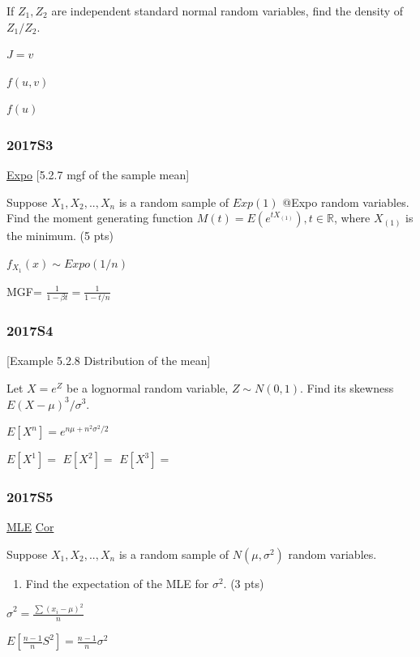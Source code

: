\documentclass[10pt,twocolumn,portrait]{article}
\providecommand{\tightlist}{%
  \setlength{\itemsep}{0pt}\setlength{\parskip}{0pt}}
\begin{document}
If \(Z_1,Z_2\) are independent standard normal random variables, find
the density of \(Z_1/Z_2\).

\(J=v\)

\(f(u,v)\)

\(f(u)\)

\hypertarget{s3-5}{%
\subsubsection{2017S3}\label{s3-5}}

\protect\hyperlink{Expo}{Expo} {[}5.2.7 mgf of the sample mean{]}

Suppose \(X_1,X_2,..,X_n\) is a random sample of \(Exp(1)\) @Expo random
variables. Find the moment generating function
\(M(t)=E(e^{tX_{(1)}}), t\in\mathbb R\), where \(X_{(1)}\) is the
minimum. (5 pts)

\(f_{X_{1}}(x)\sim Expo(1/n)\)

MGF= \(\frac1{1-\beta t}=\frac1{1-t/n}\)

\hypertarget{s4-5}{%
\subsubsection{2017S4}\label{s4-5}}

{[}Example 5.2.8 Distribution of the mean{]}

Let \(X=e^Z\) be a lognormal random variable, \(Z\sim N(0,1)\). Find its
skewness \(E(X-\mu)^3/\sigma^3\).

\(E[X^n]=e^{n\mu+n^2\sigma^2/2}\)

\(E[X^1]=\) \(E[X^2]=\) \(E[X^3]=\)

\hypertarget{s5-5}{%
\subsubsection{2017S5}\label{s5-5}}

\protect\hyperlink{MLE}{MLE} \protect\hyperlink{Cor}{Cor}

Suppose \(X_1,X_2,..,X_n\) is a random sample of \(N(\mu,\sigma^2)\)
random variables.

\begin{enumerate}
\def\labelenumi{(\alph{enumi})}
\tightlist
\item
  Find the expectation of the MLE for \(\sigma^2\). (3 pts)
\end{enumerate}

\(\hat\sigma^2=\frac{\sum(x_i-\mu)^2}{n}\)

\(E[\frac{n-1}{n}S^2]=\frac{n-1}{n}\sigma^2\)
\end{document}
